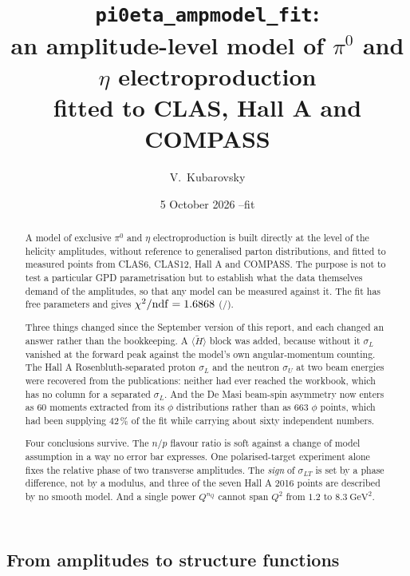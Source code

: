 \documentclass[11pt,a4paper]{article}
\title{\texttt{pi0eta\_ampmodel\_fit}:\\
       an amplitude-level model of $\pi^0$ and $\eta$ electroproduction\\
       fitted to CLAS, Hall A and COMPASS}
\author{V.\ Kubarovsky}
\date{5 October 2026 \quad--\quad fit \texttt{\fittag}}
\newcommand{\sig}[1]{\sigma_{#1}}
\begin{document}
\maketitle

\begin{abstract}
\noindent
A model of exclusive $\pi^0$ and $\eta$ electroproduction is built directly at
the level of the helicity amplitudes, without reference to generalised parton
distributions, and fitted to \nfit{} measured points from CLAS6, CLAS12,
Hall A and COMPASS.  The purpose is not to test a particular GPD
parametrisation but to establish what the data themselves demand of the
amplitudes, so that any model can be measured against it.  The fit has \npar{}
free parameters and gives $\chi^2/\mathrm{ndf} = 1.6868$ (\chitot/\ndf).

Three things changed since the September version of this report, and each
changed an answer rather than the bookkeeping.  A $\langle\tilde H\rangle$
block was added, because without it $\sig{L}$ vanished at the forward peak
against the model's own angular-momentum counting.  The Hall A
Rosenbluth-separated proton $\sig{L}$ and the neutron $\sig{U}$ at two beam
energies were recovered from the publications: neither had ever reached the
workbook, which has no column for a separated $\sig{L}$.  And the De Masi
beam-spin asymmetry now enters as 60 moments extracted from its $\phi$
distributions rather than as 663 $\phi$ points, which had been supplying
$42\,\%$ of the fit while carrying about sixty independent numbers.

Four conclusions survive.  The $n/p$ flavour ratio is soft against a change of
model assumption in a way no error bar expresses.  One polarised-target
experiment alone fixes the relative phase of two transverse amplitudes.  The
\emph{sign} of $\sig{LT}$ is set by a phase difference, not by a modulus, and
three of the seven Hall A 2016 points are described by no smooth model.  And
a single power $Q^{n_Q}$ cannot span $Q^2$ from $1.2$ to $8.3\ \mathrm{GeV}^2$.
\end{abstract}



\subsection{From amplitudes to structure functions}
\end{document}
